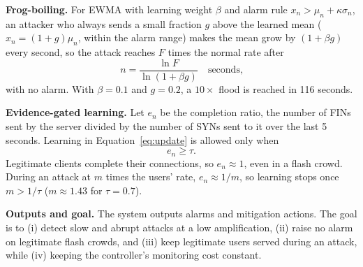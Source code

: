 \documentclass[12pt,a4paper,oneside]{report}
\begin{document}
\textbf{Frog-boiling.} For EWMA with learning weight $\beta$ and alarm rule $x_n > \mu_n + \kappa\sigma_n$, an attacker who always sends a small fraction $g$ above the learned mean ($x_n = (1+g)\mu_n$, within the alarm range) makes the mean grow by $(1+\beta g)$ every second, so the attack reaches $F$ times the normal rate after
\begin{equation}\label{eq:objective}
n = \frac{\ln F}{\ln(1+\beta g)} \quad \text{seconds,}
\end{equation}
with no alarm. With $\beta = 0.1$ and $g = 0.2$, a $10\times$ flood is reached in 116 seconds.

\textbf{Evidence-gated learning.} Let $e_n$ be the completion ratio, the number of FINs sent by the server divided by the number of SYNs sent to it over the last 5 seconds. Learning in Equation~\eqref{eq:update} is allowed only when
\begin{equation}\label{eq:gate}
e_n \ge \tau .
\end{equation}
Legitimate clients complete their connections, so $e_n \approx 1$, even in a flash crowd. During an attack at $m$ times the users' rate, $e_n \approx 1/m$, so learning stops once $m > 1/\tau$ ($m \approx 1.43$ for $\tau = 0.7$).

\textbf{Outputs and goal.} The system outputs alarms and mitigation actions. The goal is to (i) detect slow and abrupt attacks at a low amplification, (ii) raise no alarm on legitimate flash crowds, and (iii) keep legitimate users served during an attack, while (iv) keeping the controller's monitoring cost constant.
\end{document}
